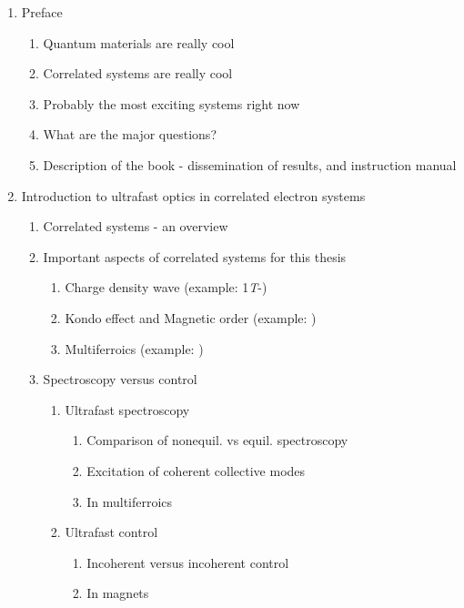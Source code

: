 \documentclass{article}
\begin{document}
\begin{enumerate}
\item Preface
    \begin{enumerate}
    \item Quantum materials are really cool
    \item Correlated systems are really cool
    \item Probably the most exciting systems right now
    \item What are the major questions?
    \item Description of the book - dissemination of results, and instruction manual
    \end{enumerate}
\item Introduction to ultrafast optics in correlated electron systems
    \begin{enumerate}
    \item Correlated systems - an overview
    \item Important aspects of correlated systems for this thesis
        \begin{enumerate}
        \item Charge density wave (example: 1\textit{T}-)
        \item Kondo effect and Magnetic order (example: )
        \item Multiferroics (example: )
        \end{enumerate}
    \item Spectroscopy versus control
        \begin{enumerate}
        \item Ultrafast spectroscopy
            \begin{enumerate}
            \item Comparison of nonequil. vs equil. spectroscopy
            \item Excitation of coherent collective modes
            \item In multiferroics
            \end{enumerate}
        \item Ultrafast control
            \begin{enumerate}
            \item Incoherent versus incoherent control
            \item In magnets
            \end{enumerate}
        \end{enumerate}
    \end{enumerate}

\end{enumerate}
\end{document}
